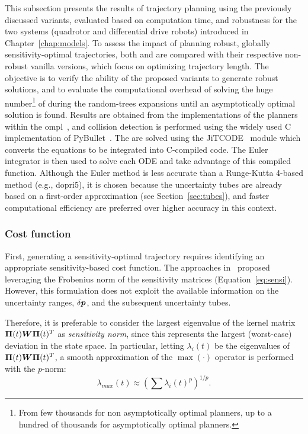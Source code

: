 This subsection presents the results of trajectory planning using the previously discussed variants, evaluated based on computation time, and robustness for the two systems (quadrotor and differential drive robots) introduced in Chapter~\ref{chap:models}.
To assess the impact of planning robust, globally sensitivity-optimal trajectories, both  and  are compared with their respective non-robust vanilla versions, which focus on optimizing trajectory length.
The objective is to verify the ability of the proposed variants to generate robust solutions, and to evaluate the computational overhead of solving the huge number\footnote{From few thousands for non asymptotically optimal planners, up to a hundred of thousands for asymptotically optimal planners.} of  during the random-trees expansions until an asymptotically optimal solution is found.
Results are obtained from the implementations of the planners within the \gls{ompl}~\cite{cOMPL}, and collision detection is performed using the widely used C implementation of PyBullet~\cite{cBullet}.
The  are solved using the JiTCODE~\cite{cJit} module which converts the equations to be integrated into C-compiled code.
The Euler integrator is then used to solve each ODE and take advantage of this compiled function.
Although the Euler method is less accurate than a Runge-Kutta 4-based method (e.g., dopri5), it is chosen because the uncertainty tubes are already based on a first-order approximation (see Section~\ref{sec:tubes}), and faster computational efficiency are preferred over higher accuracy in this context.

\subsubsection{Cost function}\label{sec:sensi_cost}

First, generating a sensitivity-optimal trajectory requires identifying an appropriate sensitivity-based cost function.
The approaches in~\cite{cPi, cTh} proposed leveraging the Frobenius norm of the sensitivity matrices (Equation~\ref{eq:sensi}).
However, this formulation does not exploit the available information on the uncertainty ranges, $\delta \boldsymbol{p}$, and the subsequent uncertainty tubes.

Therefore, it is preferable to consider the largest eigenvalue of the kernel matrix $\boldsymbol{\Pi}(t) \boldsymbol{W} \boldsymbol{\Pi}(t)^T$ as \emph{sensitivity norm}, since this represents the largest (worst-case) deviation in the state space. 
In particular, letting $\lambda_i(t)$ be the eigenvalues of $\boldsymbol{\Pi}(t) \boldsymbol{W} \boldsymbol{\Pi}(t)^T$, a smooth approximation of the $\max(\cdot)$ operator is performed with the $p$-norm:
\begin{equation}
    \lambda_{max}(t)\approx \left(\sum \lambda_{i}(t)^p\right)^{1/p}.
\end{equation} 

